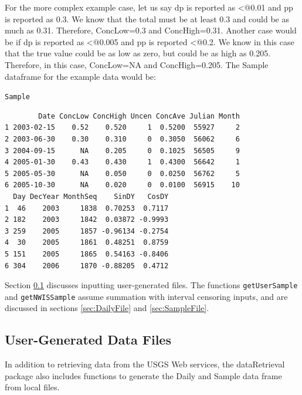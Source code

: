 \documentclass[a4paper,11pt]{article}\usepackage[]{graphicx}\usepackage[]{color}
\makeatletter
\newcommand{\hlstd}[1]{\textcolor[rgb]{0.345,0.345,0.345}{#1}}%
\newenvironment{kframe}{%
 \def\at@end@of@kframe{}%
 \ifinner\ifhmode%
  \def\at@end@of@kframe{\end{minipage}}%
  \begin{minipage}{\columnwidth}%
 \fi\fi%
 \def\FrameCommand##1{\hskip\@totalleftmargin \hskip-\fboxsep
 \colorbox{shadecolor}{##1}\hskip-\fboxsep
     \hskip-\linewidth \hskip-\@totalleftmargin \hskip\columnwidth}%
 \MakeFramed {\advance\hsize-\width
   \@totalleftmargin\z@ \linewidth\hsize
   \@setminipage}}%
 {\par\unskip\endMakeFramed%
 \at@end@of@kframe}
\newenvironment{knitrout}{}{} %
\makeatother
\begin{document}
For the more complex example case, let us say dp is reported as \verb@<@0.01 and pp is reported as 0.3. We know that the total must be at least 0.3 and could be as much as 0.31. Therefore, ConcLow=0.3 and ConcHigh=0.31. Another case would be if dp is reported as \verb@<@0.005 and pp is reported \verb@<@0.2. We know in this case that the true value could be as low as zero, but could be as high as 0.205. Therefore, in this case, ConcLow=NA and ConcHigh=0.205. The Sample dataframe for the example data would be:



\begin{knitrout}
\color{fgcolor}\begin{kframe}
\begin{alltt}
  \hlstd{Sample}
\end{alltt}
\begin{verbatim}
        Date ConcLow ConcHigh Uncen ConcAve Julian Month
1 2003-02-15    0.52    0.520     1  0.5200  55927     2
2 2003-06-30    0.30    0.310     0  0.3050  56062     6
3 2004-09-15      NA    0.205     0  0.1025  56505     9
4 2005-01-30    0.43    0.430     1  0.4300  56642     1
5 2005-05-30      NA    0.050     0  0.0250  56762     5
6 2005-10-30      NA    0.020     0  0.0100  56915    10
  Day DecYear MonthSeq    SinDY   CosDY
1  46    2003     1838  0.70253  0.7117
2 182    2003     1842  0.03872 -0.9993
3 259    2005     1857 -0.96134 -0.2754
4  30    2005     1861  0.48251  0.8759
5 151    2005     1865  0.54163 -0.8406
6 304    2006     1870 -0.88205  0.4712
\end{verbatim}
\end{kframe}
\end{knitrout}

Section \ref{sec:userFiles} discusses inputting user-generated files. The functions \texttt{getUserSample} and \texttt{getNWISSample} assume summation with interval censoring inputs, and are discussed in sections \ref{sec:DailyFile} and \ref{sec:SampleFile}.

\FloatBarrier

\subsection{User-Generated Data Files}
\label{sec:userFiles}
In addition to retrieving data from the USGS Web services, the dataRetrieval package also includes functions to generate the Daily and Sample data frame from local files.
\end{document}
